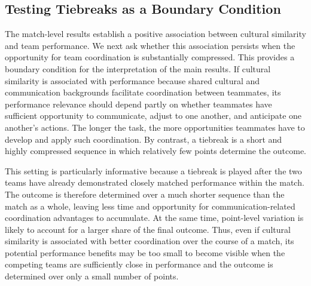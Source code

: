 \documentclass[10pt]{article}
\begin{document}
\subsection{Testing Tiebreaks as a Boundary Condition} 



The match-level results establish a positive association between cultural similarity and team performance. We next ask whether this association persists when the opportunity for team coordination is substantially compressed. This provides a boundary condition for the interpretation of the main results. If cultural similarity is associated with performance because shared cultural and communication backgrounds facilitate coordination between teammates, its performance relevance should depend partly on whether teammates have sufficient opportunity to communicate, adjust to one another, and anticipate one another's actions. The longer the task, the more opportunities teammates have to develop and apply such coordination. By contrast, a tiebreak is a short and highly compressed sequence in which relatively few points determine the outcome.

This setting is particularly informative because a tiebreak is played after the two teams have already demonstrated closely matched performance within the match. The outcome is therefore determined over a much shorter sequence than the match as a whole, leaving less time and opportunity for communication-related coordination advantages to accumulate. At the same time, point-level variation is likely to account for a larger share of the final outcome. Thus, even if cultural similarity is associated with better coordination over the course of a match, its potential performance benefits may be too small to become visible when the competing teams are sufficiently close in performance and the outcome is determined over only a small number of points.
\end{document}

